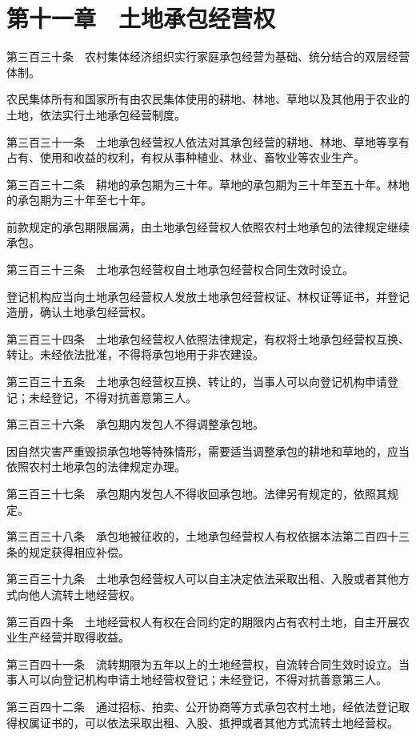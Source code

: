 \documentclass[UTF8,12pt,a4paper]{ctexbook}
\begin{document}
\section*{第十一章　土地承包经营权}

第三百三十条　农村集体经济组织实行家庭承包经营为基础、统分结合的双层经营体制。

农民集体所有和国家所有由农民集体使用的耕地、林地、草地以及其他用于农业的土地，依法实行土地承包经营制度。

第三百三十一条　土地承包经营权人依法对其承包经营的耕地、林地、草地等享有占有、使用和收益的权利，有权从事种植业、林业、畜牧业等农业生产。

第三百三十二条　耕地的承包期为三十年。草地的承包期为三十年至五十年。林地的承包期为三十年至七十年。

前款规定的承包期限届满，由土地承包经营权人依照农村土地承包的法律规定继续承包。

第三百三十三条　土地承包经营权自土地承包经营权合同生效时设立。

登记机构应当向土地承包经营权人发放土地承包经营权证、林权证等证书，并登记造册，确认土地承包经营权。

第三百三十四条　土地承包经营权人依照法律规定，有权将土地承包经营权互换、转让。未经依法批准，不得将承包地用于非农建设。

第三百三十五条　土地承包经营权互换、转让的，当事人可以向登记机构申请登记；未经登记，不得对抗善意第三人。

第三百三十六条　承包期内发包人不得调整承包地。

因自然灾害严重毁损承包地等特殊情形，需要适当调整承包的耕地和草地的，应当依照农村土地承包的法律规定办理。

第三百三十七条　承包期内发包人不得收回承包地。法律另有规定的，依照其规定。

第三百三十八条　承包地被征收的，土地承包经营权人有权依据本法第二百四十三条的规定获得相应补偿。

第三百三十九条　土地承包经营权人可以自主决定依法采取出租、入股或者其他方式向他人流转土地经营权。

第三百四十条　土地经营权人有权在合同约定的期限内占有农村土地，自主开展农业生产经营并取得收益。

第三百四十一条　流转期限为五年以上的土地经营权，自流转合同生效时设立。当事人可以向登记机构申请土地经营权登记；未经登记，不得对抗善意第三人。

第三百四十二条　通过招标、拍卖、公开协商等方式承包农村土地，经依法登记取得权属证书的，可以依法采取出租、入股、抵押或者其他方式流转土地经营权。
\end{document}
